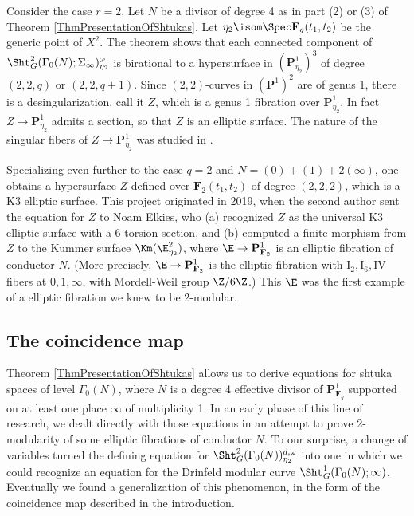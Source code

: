\documentclass{article}
\def\F{\mathbf{F}}
\def\P{\mathbf{P}}
\newcommand{\I}{\mathrm{I}}
\newcommand{\IV}{\mathrm{IV}}
\begin{document}
\begin{rmk}  Consider the case $r=2$.   Let $N$ be a divisor of degree 4 as in part (2) or (3) of Theorem \ref{ThmPresentationOfShtukas}.  Let $\eta_2\isom \Spec \F_q(t_1,t_2)$ be the generic point of $X^2$.  The theorem shows that each connected component of $\Sht_G^2(\Gamma_0(N);\Sigma_\infty)^{\omega}_{\eta_2}$ is birational to a hypersurface in $(\P^1_{\eta_2})^3$ of degree $(2,2,q)$ or $(2,2,q+1)$.  Since $(2,2)$-curves in $(\P^1)^2$ are of genus 1, there is a desingularization, call it $Z$, which is a genus 1 fibration over $\P^1_{\eta_2}$.    In fact $Z\to\P^1_{\eta_2}$ admits a section, so that $Z$ is an elliptic surface.  The nature of the singular fibers of $Z\to \P^1_{\eta_2}$ was studied in \cite{Fernandez}.  

Specializing even further to the case $q=2$ and $N=(0)+(1)+2(\infty)$, one obtains a hypersurface $Z$ defined over $\F_2(t_1,t_2)$ of degree $(2,2,2)$, which is a K3 elliptic surface.  This project originated in 2019, when the second author sent the equation for $Z$ to Noam Elkies, who (a) recognized $Z$ as the universal K3 elliptic surface with a 6-torsion section, and (b) computed a finite morphism from $Z$ to the Kummer surface $\Km(\E_{\eta_2}^2)$, where $\E\to\P^1_{\F_2}$ is an elliptic fibration of conductor $N$.  (More precisely, $\E\to\P^1_{\F_2}$ is the elliptic fibration with $\I_2,\I_6,\IV$ fibers at $0,1,\infty$, with Mordell-Weil group $\Z/6\Z$.)   This $\E$ was the first example of a elliptic fibration we knew to be 2-modular.  
\end{rmk}


\subsection{The coincidence map}

Theorem \ref{ThmPresentationOfShtukas} allows us to derive equations for shtuka spaces of level $\Gamma_0(N)$, where $N$
is a degree 4 effective divisor of $\P^1_{\F_q}$ supported on at least one place $\infty$ of multiplicity 1.   In an early phase of this line of research, we dealt directly with those equations in an attempt to prove 2-modularity of some elliptic fibrations of conductor $N$.   To our surprise, a change of variables turned the defining equation for $\Sht^2_G(\Gamma_0(N))^{d,\omega}_{\eta_2}$ into one in which we could recognize an equation for the Drinfeld modular curve $\Sht^1_G(\Gamma_0(N);\infty)$.  Eventually we found a generalization of this phenomenon, in the form of the coincidence map described in the introduction.
\end{document}
